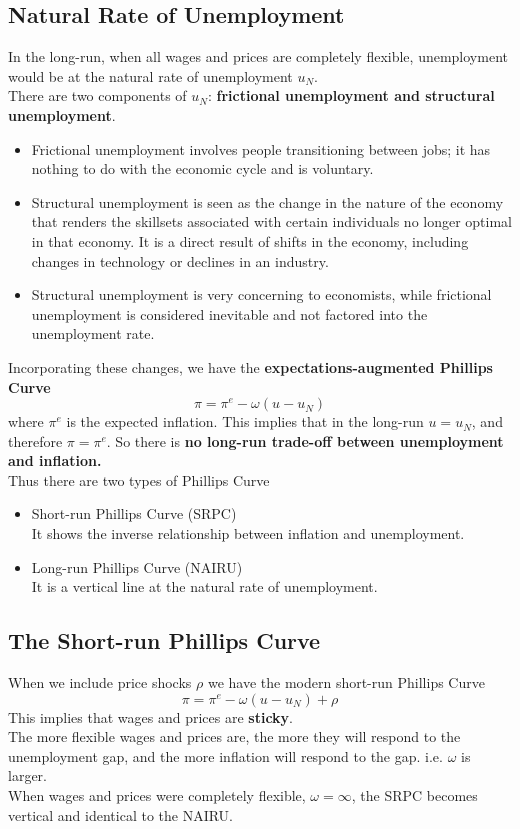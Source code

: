\documentclass[a4paper]{article}
\begin{document}
\subsection{Natural Rate of Unemployment}
In the long-run, when all wages and prices are completely flexible, unemployment
would be at the natural rate of unemployment $u_N$. \smallskip \\
There are two components of $u_N$: \textbf{frictional unemployment and structural
unemployment}. \begin{itemize}
    \item Frictional unemployment involves people transitioning between jobs; 
    it has nothing to do with the economic cycle and is voluntary.
    \item Structural unemployment is seen as the change in the nature of the 
    economy that renders the skillsets associated with certain individuals no 
    longer optimal in that economy. It is a direct result of shifts in the 
    economy, including changes in technology or declines in an industry.
    \item Structural unemployment is very concerning to economists, while 
    frictional unemployment is considered inevitable and not factored into 
    the unemployment rate.
\end{itemize}
%
Incorporating these changes, we have the \textbf{expectations-augmented 
Phillips Curve}
\[ \pi = \pi^e - \omega(u - u_N) \]
where $\pi^e$ is the expected inflation. This implies that in the long-run
$u = u_N$, and therefore $\pi = \pi^e$. So there is 
\textbf{no long-run trade-off between 
unemployment and inflation. } \smallskip \\
Thus there are two types of Phillips Curve \begin{itemize}
    \item Short-run Phillips Curve (SRPC) \smallskip \\
    It shows the inverse relationship between inflation and unemployment.
    \item Long-run Phillips Curve (NAIRU) \smallskip \\
    It is a vertical line at the natural rate of unemployment.
\end{itemize}

\subsection{The Short-run Phillips Curve}
When we include price shocks $\rho$ we have the modern short-run Phillips
Curve
\[ \pi = \pi^e - \omega(u - u_N) + \rho \]
This implies that wages and prices are \textbf{sticky}.
\smallskip \\
The more flexible wages and prices are, the more they will respond to the
unemployment gap, and the more inflation will respond to the gap. i.e. 
$\omega$ is larger.
\smallskip \\
When wages and prices were completely flexible, $\omega = \infty$,
the SRPC becomes vertical and identical to the NAIRU.
\end{document}
